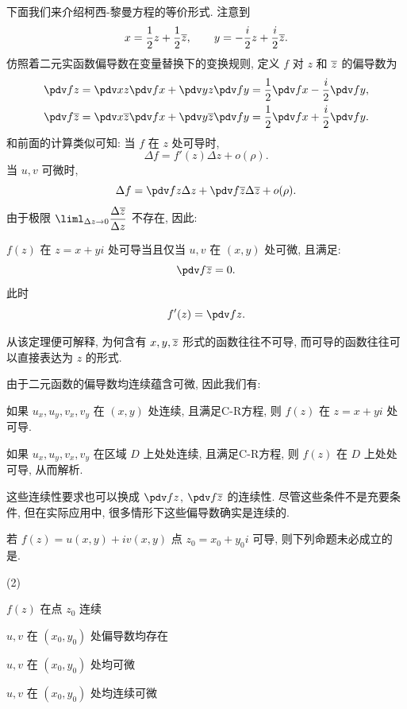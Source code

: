 下面我们来介绍柯西-黎曼方程的等价形式.
注意到
\[
  x=\dfrac12z+\dfrac12\overline z,\qquad
  y=-\dfrac i2z+\dfrac i2\overline z.
\]
仿照着二元实函数偏导数在变量替换下的变换规则, 定义 $f$ 对 $z$ 和 $\overline z$ 的偏导数为
  \[\begin{aligned}
      \pdv fz&
    =\pdv xz\pdv fx+\pdv yz\pdv fy
    =\frac12\pdv fx-\frac i2\pdv fy,\\
      \pdv f{\ov z}&
    =\pdv x{\ov z}\pdv fx+\pdv y{\ov z}\pdv fy
    =\frac12\pdv fx+\frac i2\pdv fy.
  \end{aligned}\]
和前面的计算类似可知: 当 $f$ 在 $z$ 处可导时,
\[
  \Delta f=f'(z)\Delta z+o(\rho).
\]
当 $u,v$ 可微时,
\[
  \Delta f=\pdv fz\Delta z+\pdv f{\ov z}\Delta\ov z+o(\rho).
\]
由于极限 $\liml_{\Delta z\to 0}\dfrac{\Delta \ov z}{\Delta z}$ 不存在, 因此:
\begin{theorem}[柯西-黎曼定理的等价形式]
  $f(z)$ 在 $z=x+yi$ 处可导当且仅当 $u,v$ 在 $(x,y)$ 处可微, 且满足:
  \[
    \pdv f{\ov z}=0.
  \]
  此时
  \[
    f'(z)=\pdv fz.
  \]
\end{theorem}
从该定理便可解释, 为何含有 $x,y,\overline z$ 形式的函数往往不可导, 而可导的函数往往可以直接表达为 $z$ 的形式.

由于二元函数的偏导数均连续蕴含可微, 因此我们有:
\begin{theorem}
  \begin{enumpar}
    \item 如果 $u_x,u_y,v_x,v_y$ 在 $(x,y)$ 处连续, 且满足C-R方程, 则 $f(z)$ 在 $z=x+yi$ 处可导.
    \item 如果 $u_x,u_y,v_x,v_y$ 在区域 $D$ 上处处连续, 且满足C-R方程, 则 $f(z)$ 在 $D$ 上处处可导, 从而解析.
  \end{enumpar}
\end{theorem}
这些连续性要求也可以换成 $\displaystyle \pdv fz$, $\displaystyle \pdv f{\ov z}$ 的连续性.
尽管这些条件不是充要条件, 但在实际应用中, 很多情形下这些偏导数确实是连续的.

\begin{exercise}
  若 $f(z)=u(x,y)+iv(x,y)$ 点 $z_0=x_0+y_0i$ 可导, 则下列命题未必成立的是\fillbrace{}.
  \begin{exchoice}(2)
    \item $f(z)$ 在点 $z_0$ 连续
    \item $u,v$ 在 $(x_0,y_0)$ 处偏导数均存在
    \item $u,v$ 在 $(x_0,y_0)$ 处均可微
    \item $u,v$ 在 $(x_0,y_0)$ 处均连续可微
  \end{exchoice}
\end{exercise}


